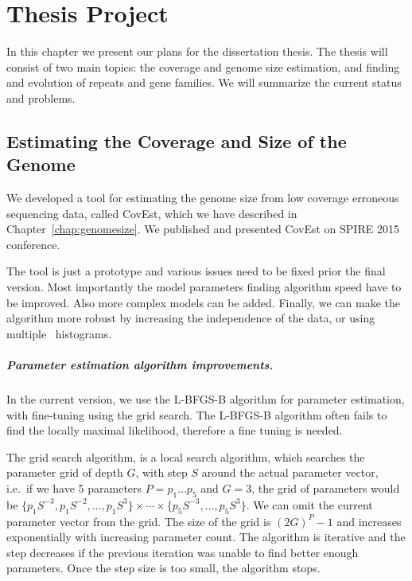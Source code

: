 \chapter{Thesis Project}

In this chapter we present our plans for the dissertation thesis. The thesis will consist of two main topics:
the coverage and genome size estimation, and finding and evolution of repeats and gene families.
We will summarize the current status and problems.

\section{Estimating the Coverage and Size of the Genome}

We developed a tool for estimating the genome size from low coverage erroneous sequencing data, called CovEst, which we have described in Chapter~\ref{chap:genomesize}. We published and presented CovEst on SPIRE 2015 conference\cite{covest}.

The tool is just a prototype and various issues need to be fixed prior the final version. Most importantly the model parameters finding algorithm speed have to be improved. Also more complex models can be added. Finally, we can make the algorithm more robust by increasing the independence of the data, or using multiple \kmer\ histograms.

\paragraph{Parameter estimation algorithm improvements.}
In the current version, we use the L-BFGS-B\cite{l-bfgs-b} algorithm for parameter estimation, with fine-tuning using the grid search.
The L-BFGS-B algorithm often fails to find the locally maximal likelihood, therefore a fine tuning is needed.

The grid search algorithm, is a local search algorithm, which searches the parameter grid of depth $G$, with step $S$ around the actual parameter vector, i.e.\ if we have 5 parameters $P = p_1\dots p_5$ and $G = 3$, the grid of parameters would be $\{p_1 S^{-3}, p_1 S^{-2}, \dots, p_1 S^3\} \times \cdots \times \{p_5 S^{-3}, \dots, p_5 S^3\}$. We can omit the current parameter vector from the grid. The size of the grid is ${(2G)}^P - 1$ and increases exponentially with increasing parameter count. The algorithm is iterative and the step decreases if the previous iteration was unable to find better enough parameters. Once the step size is too small, the algorithm stops.

